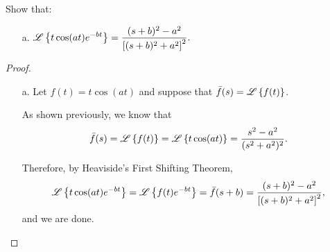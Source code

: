 \begin{problem}{3.23}
  Show that:
  \begin{enumerate}
    \item[a.] $\displaystyle \mathscr{L}\left\{ {t \cos(at) e^{-bt}} \right\} = \frac{(s+b)^2 - a^2}{\left[(s+b)^2+a^2\right]^2}.$
  \end{enumerate}
\end{problem}

\begin{proof}
  \begin{enumerate}
    \item[a.] Let $f(t) = t \cos(at)$ and suppose that $\bar{f}(s) = \mathscr{L}\left\{ {f(t)} \right\}$.

      As shown previously, we know that
      \begin{align*}
        \bar{f}(s) = \mathscr{L}\left\{ {f(t)} \right\} = \mathscr{L}\left\{ {t \cos(at)} \right\} = \frac{s^2 - a^2}{(s^2+a^2)^2}.
      \end{align*}

      Therefore, by Heaviside's First Shifting Theorem,
      \begin{align*}
        \mathscr{L}\left\{ {t\cos (at) e^{-bt}} \right\} = \mathscr{L}\left\{ {f(t)e^{-bt}} \right\} = \bar{f}(s+b) = \frac{(s+b)^2 - a^2}{\left[(s+b)^2+a^2\right]^2},
      \end{align*}
      and we are done.
  \end{enumerate}
\end{proof}
\newpage
